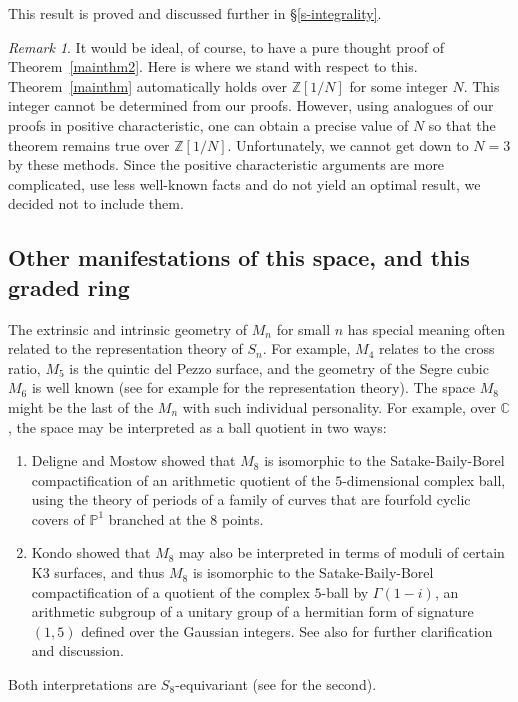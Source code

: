 \documentclass{amsart}
\theoremstyle{definition}
\theoremstyle{remark}
\newtheorem{remark}[theorem]{\it Remark}
\def\Z{\mathbb{Z}}
\def\P{\mathbb{P}}
\def\C{\mathbb{C}}
\begin{document}
This result is proved and discussed further in \S \ref{s-integrality}.

\begin{remark}
It would be ideal, of course, to have a pure thought proof of
Theorem~\ref{mainthm2}.  Here is where we stand with respect to this.
Theorem~\ref{mainthm} automatically holds over $\Z[1/N]$ for some integer $N$.
This integer cannot be determined from our proofs.  However, using analogues
of our proofs in positive characteristic, one can obtain a precise value of
$N$ so that the theorem remains true over $\Z[1/N]$.  Unfortunately, we
cannot get down to $N=3$ by these methods.  Since the positive characteristic
arguments are more complicated, use less well-known facts and do not yield an
optimal result, we decided not to include them.
\end{remark}


\subsection{Other manifestations of this space, and this graded ring}
\label{s:1-1}

The extrinsic and intrinsic geometry of $M_n$ for small $n$ has
special meaning often related to the representation theory of $S_n$.
For example, $M_4$ relates to the cross ratio, $M_5$ is the quintic
del Pezzo surface, and the geometry of the Segre cubic $M_6$ is well
known (see for example \cite{hmsv6} for the representation theory).
The space $M_8$ might be the last of the $M_n$ with such individual
personality.  For example, over $\C$, the space may be interpreted as
a ball quotient in two ways:
\begin{enumerate}
\item Deligne and Mostow \cite{dm} showed that $M_8$ is isomorphic to
  the Satake-Baily-Borel compactification of an arithmetic quotient of
  the $5$-dimensional complex ball, using the theory of periods of a
  family of curves that are fourfold cyclic covers of $\P^1$
  branched at the $8$ points.
\item Kondo \cite{kondo} showed that $M_8$ may also be interpreted in
  terms of moduli of certain K3 surfaces, and thus $M_8$ is isomorphic
  to the Satake-Baily-Borel compactification of a quotient of the
  complex $5$-ball by $\Gamma(1-i)$, an arithmetic subgroup of a
  unitary group of a hermitian form of signature $(1,5)$ defined over
  the Gaussian integers.  See also \cite[p.~12]{fs} for further
  clarification and discussion.
\end{enumerate}
Both interpretations are $S_8$-equivariant (see  \cite[p.~8]{kondo}
for the second).
\end{document}
